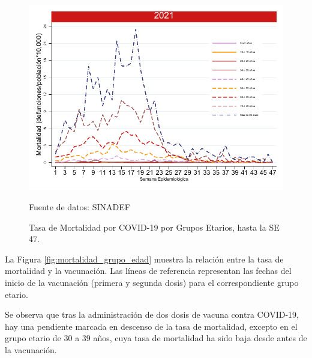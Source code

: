 \documentclass[12pt,a4paper,openany]{book}
\begin{document}
	\begin{figure}[h]
	\caption{Tasa de Mortalidad por COVID-19 por Grupos Etarios, hasta la SE 47.}\label{fig:mortalidad_edad}
	\begin{center}
		\includegraphics[width=0.65\linewidth]{../figuras/mortalidad_edad.pdf}
	\end{center}
	{\footnotesize Fuente de datos: SINADEF} 
	\end{figure}


	La Figura \ref{fig:mortalidad_grupo_edad} muestra la relación entre la tasa de mortalidad y la vacunación. Las líneas de referencia representan las fechas del inicio de la vacunación (primera y segunda dosis) para el correspondiente grupo etario. 
	
	Se observa que tras la administración de dos dosis de vacuna contra COVID-19,  hay una pendiente marcada en descenso de la tasa de mortalidad, excepto en el grupo etario de 30 a 39 años, cuya tasa de mortalidad ha sido baja desde antes de la vacunación.
\end{document}
